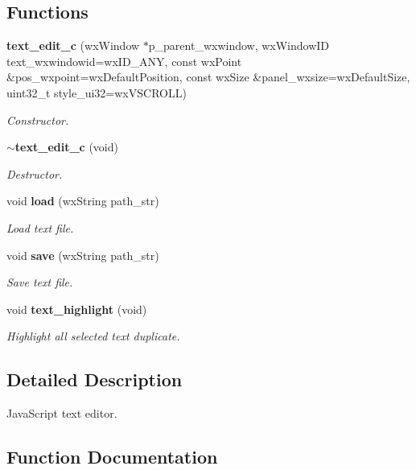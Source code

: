 \subsection*{Functions}
\begin{DoxyCompactItemize}
\item 
\textbf{ text\+\_\+edit\+\_\+c} (wx\+Window $\ast$p\+\_\+parent\+\_\+wxwindow, wx\+Window\+ID text\+\_\+wxwindowid=wx\+I\+D\+\_\+\+A\+NY, const wx\+Point \&pos\+\_\+wxpoint=wx\+Default\+Position, const wx\+Size \&panel\+\_\+wxsize=wx\+Default\+Size, uint32\+\_\+t style\+\_\+ui32=wx\+V\+S\+C\+R\+O\+LL)
\begin{DoxyCompactList}\small\item\em Constructor. \end{DoxyCompactList}\item 
\textbf{ $\sim$text\+\_\+edit\+\_\+c} (void)
\begin{DoxyCompactList}\small\item\em Destructor. \end{DoxyCompactList}\item 
void \textbf{ load} (wx\+String path\+\_\+str)
\begin{DoxyCompactList}\small\item\em Load text file. \end{DoxyCompactList}\item 
void \textbf{ save} (wx\+String path\+\_\+str)
\begin{DoxyCompactList}\small\item\em Save text file. \end{DoxyCompactList}\item 
void \textbf{ text\+\_\+highlight} (void)
\begin{DoxyCompactList}\small\item\em Highlight all selected text duplicate. \end{DoxyCompactList}\end{DoxyCompactItemize}


\subsection{Detailed Description}
Java\+Script text editor. 



\subsection{Function Documentation}
\mbox{\label{group___edit__text_ga8caf41718ffb5bf060de703f18f72546}} 
